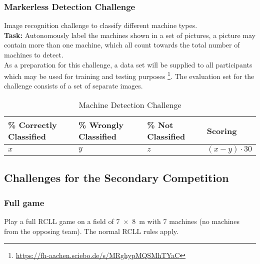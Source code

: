 \documentclass[12pt,twoside]{article}
\begin{document}
\subsubsection{Markerless Detection Challenge}\label{sec:markerless}
Image recognition challenge to classify different machine types.\\
\textbf{Task:} Autonomously label the machines shown in a set of pictures,
a picture may contain more than one machine, which all count towards the
total number of machines to detect.\\
As a preparation for this challenge, a data set will be supplied to
all participants which may be used for training and testing purposes
\footnote{\url{https://fh-aachen.sciebo.de/s/MRghypMQSMhTYaC}}.
The evaluation set for the challenge consists of a set of separate images.
\begin{table}[!htb]
 \centering
 \begin{tabularx}{\linewidth}{l|l|l|l}
  \% Correctly Classified & \% Wrongly Classified & \% Not Classified
  & Scoring \\\hline
  $x$ & $y$ & $z$ & $(x-y)\cdot30$
 \end{tabularx}
 \caption{Machine Detection Challenge}
 \label{tab:challenge-markerless}
\end{table}

\subsection{Challenges for the Secondary Competition}

\subsubsection{Full game}\label{sec:challenge-full-game}
Play a full RCLL game on a field of \SI{7 x 8}{\metre} with $7$ machines
(no machines from the opposing team). The normal RCLL rules apply.
\end{document}
